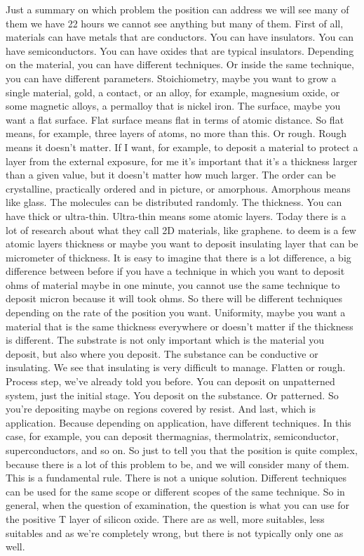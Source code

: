 Just a summary on which problem the position can address we will see many of them we have 22 hours we cannot see anything but many of them. First of all, materials can have metals that are conductors. You can have insulators. You can have semiconductors. You can have oxides that are typical insulators. Depending on the material, you can have different techniques. Or inside the same technique, you can have different parameters. Stoichiometry, maybe you want to grow a single material, gold, a contact, or an alloy, for example, magnesium oxide, or some magnetic alloys, a permalloy that is nickel iron. The surface, maybe you want a flat surface. Flat surface means flat in terms of atomic distance. So flat means, for example, three layers of atoms, no more than this. Or rough. Rough means it doesn't matter. If I want, for example, to deposit a material to protect a layer from the external exposure, for me it's important that it's a thickness larger than a given value, but it doesn't matter how much larger. The order can be crystalline, practically ordered and in picture, or amorphous. Amorphous means like glass. The molecules can be distributed randomly. The thickness. You can have thick or ultra-thin. Ultra-thin means some atomic layers. Today there is a lot of research about what they call 2D materials, like graphene. to deem is a few atomic layers thickness or maybe you want to deposit insulating layer that can be micrometer of thickness. It is easy to imagine that there is a lot difference, a big difference between before if you have a technique in which you want to deposit ohms of material maybe in one minute, you cannot use the same technique to deposit micron because it will took ohms. So there will be different techniques depending on the rate of the position you want. Uniformity, maybe you want a material that is the same thickness everywhere or doesn't matter if the thickness is different. The substrate is not only important which is the material you deposit, but also where you deposit. The substance can be conductive or insulating. We see that insulating is very difficult to manage. Flatten or rough. Process step, we've already told you before. You can deposit on unpatterned system, just the initial stage. You deposit on the substance. Or patterned. So you're depositing maybe on regions covered by resist. And last, which is application. Because depending on application, have different techniques. In this case, for example, you can deposit thermagnias, thermolatrix, semiconductor, superconductors, and so on. So just to tell you that the position is quite complex, because there is a lot of this problem to be, and we will consider many of them. This is a fundamental rule. There is not a unique solution. Different techniques can be used for the same scope or different scopes of the same technique. So in general, when the question of examination, the question is what you can use for the positive T layer of silicon oxide. There are as well, more suitables, less suitables and as we're completely wrong, but there is not typically only one as well.
